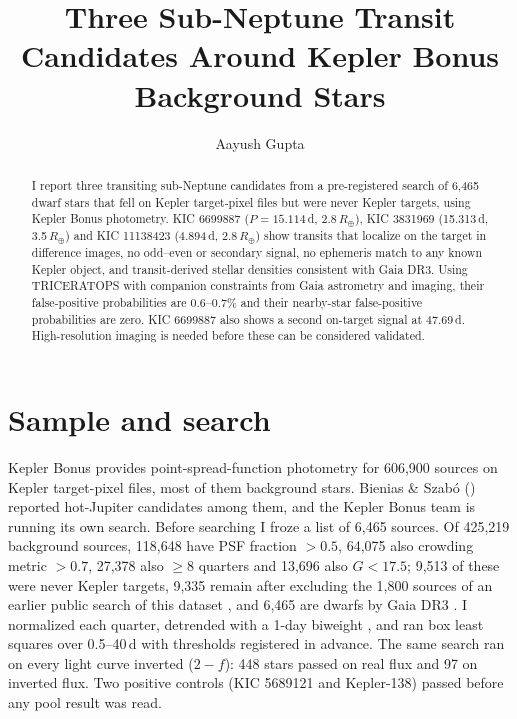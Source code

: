 \documentclass[RNAAS]{aastex701}
\begin{document}
\title{Three Sub-Neptune Transit Candidates Around Kepler Bonus Background Stars}

\author[0009-0006-1165-0828]{Aayush Gupta}

\begin{abstract}
I report three transiting sub-Neptune candidates from a pre-registered search of 6,465 dwarf stars that fell on Kepler target-pixel files but were never Kepler targets, using Kepler Bonus photometry. KIC 6699887 ($P = 15.114$\,d, 2.8\,$R_\oplus$), KIC 3831969 (15.313\,d, 3.5\,$R_\oplus$) and KIC 11138423 (4.894\,d, 2.8\,$R_\oplus$) show transits that localize on the target in difference images, no odd--even or secondary signal, no ephemeris match to any known Kepler object, and transit-derived stellar densities consistent with Gaia DR3. Using TRICERATOPS with companion constraints from Gaia astrometry and imaging, their false-positive probabilities are 0.6--0.7\% and their nearby-star false-positive probabilities are zero. KIC 6699887 also shows a second on-target signal at 47.69\,d. High-resolution imaging is needed before these can be considered validated.
\end{abstract}

\section{Sample and search}
Kepler Bonus \citep{MartinezPalomera2023} provides point-spread-function photometry for 606,900 sources on Kepler target-pixel files, most of them background stars. Bienias \& Szab\'o (\citeyear{Bienias2025}) reported hot-Jupiter candidates among them, and the Kepler Bonus team is running its own search. Before searching I froze a list of 6,465 sources. Of 425,219 background sources, 118,648 have PSF fraction $>0.5$, 64,075 also crowding metric $>0.7$, 27,378 also $\geq8$ quarters and 13,696 also $G<17.5$; 9,513 of these were never Kepler targets, 9,335 remain after excluding the 1,800 sources of an earlier public search of this dataset \citep{Mehta2026}, and 6,465 are dwarfs by Gaia DR3 \citep{Gaia2023}. I normalized each quarter, detrended with a 1-day biweight \citep{Hippke2019}, and ran box least squares \citep{Kovacs2002} over 0.5--40\,d with thresholds registered in advance. The same search ran on every light curve inverted ($2-f$): 448 stars passed on real flux and 97 on inverted flux. Two positive controls (KIC 5689121 and Kepler-138) passed before any pool result was read.
\end{document}
